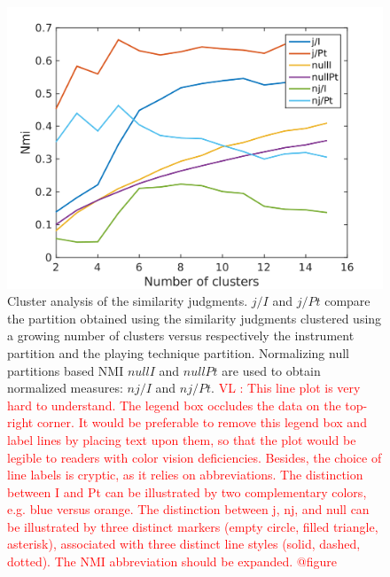 \documentclass{article}
\makeatletter
\newcommand*{\eg}{e.g.\@\xspace}
\newcommand{\vl}[1]{\textcolor{red}{VL : #1}}
\makeatother
\begin{document}
\begin{figure}
\center
\includegraphics[width = \textwidth]{figures/clusterAnalysis.png}
\caption{Cluster analysis of the similarity judgments. $j/I$ and $j/Pt$ compare the partition obtained using the similarity judgments clustered using a growing number of clusters versus respectively the instrument partition and the playing technique partition. Normalizing null partitions based NMI $nullI$ and $nullPt$ are used to obtain normalized measures: $nj/I$ and $nj/Pt$.
\vl{This line plot is very hard to understand.
The legend box occludes the data on the top-right corner.
It would be preferable to remove this legend box and label lines
by placing text upon them,
so that the plot would be legible to readers with color vision deficiencies.
Besides, the choice of line labels is cryptic, as it relies on abbreviations.
The distinction between I and Pt
can be illustrated by two complementary colors, \eg{} blue versus orange.
The distinction between j, nj, and null
can be illustrated by three distinct markers
(empty circle, filled triangle, asterisk),
associated with
three distinct line styles (solid, dashed, dotted).
The NMI abbreviation should be expanded.
@figure}}
\label{fig:clusters}
\end{figure}
\end{document}
